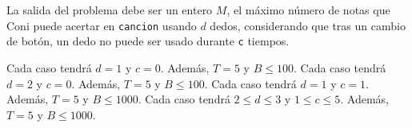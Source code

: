\documentclass{oci}
\begin{document}
\begin{outputDescription}
La salida del problema debe ser un entero $M$, el máximo número de notas que
Coni puede acertar en \verb#cancion# usando $d$ dedos, considerando que tras un
cambio de botón, un dedo no puede ser usado durante \verb#c# tiempos.
\end{outputDescription}

\begin{scoreDescription}
   Cada caso tendrá $d = 1$ y $c = 0$. Además, $T = 5$ y $B \le 100$.
   Cada caso tendrá $d = 2$ y $c = 0$. Además, $T = 5$ y $B \le 100$.
   Cada caso tendrá $d = 1$ y $c = 1$. Además, $T = 5$ y $B \le 1000$.
   Cada caso tendrá $2 \le d \le 3$ y $1 \le c \le 5$. Además, $T = 5$ y $B \le 1000$.
\end{scoreDescription}

\begin{sampleDescription}
\end{sampleDescription}
\end{document}
